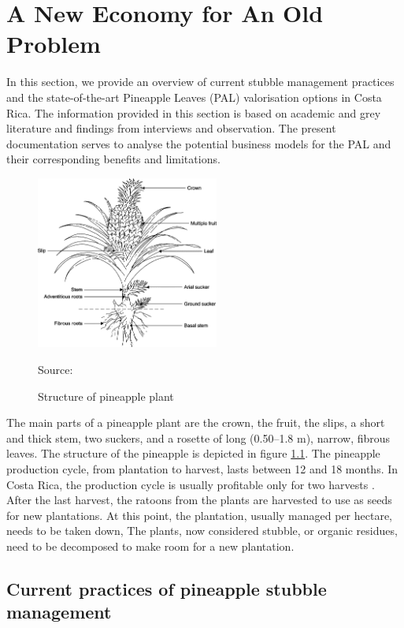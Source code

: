 \chapter{A New Economy for An Old Problem}
\label{neweconomy}

In this section, we provide an overview of current stubble management practices and the state-of-the-art Pineapple Leaves (PAL) valorisation options in Costa Rica. The information provided in this section is based on academic and grey literature and findings from interviews and observation. The present documentation serves to analyse the potential business models for the PAL and their corresponding benefits and limitations. 

\begin{figure}[H]
\caption{Structure of pineapple plant}
\label{pineappleStructure}
\centering
\includegraphics[width=6cm]{fig/pineappleStructure.png}

\scriptsize Source: \cite{hassan2011pineapple}
\end{figure}

The main parts of a pineapple plant are the crown, the fruit, the slips, a short and thick stem, two suckers, and a rosette of long (0.50–1.8 m), narrow, fibrous leaves. The structure of the pineapple is depicted in figure \ref{pineappleStructure}. The pineapple production cycle, from plantation to harvest, lasts between 12 and 18 months. In Costa Rica, the production cycle is usually profitable only for two harvests \citep{ingwersen2012life, magHarvest, zhang2016phenological}. After the last harvest, the ratoons from the plants are harvested to use as seeds for new plantations. At this point, the plantation, usually managed per hectare, needs to be taken down, The plants, now considered stubble, or organic residues, need to be decomposed to make room for a new plantation.

\section{Current practices of pineapple stubble management}

